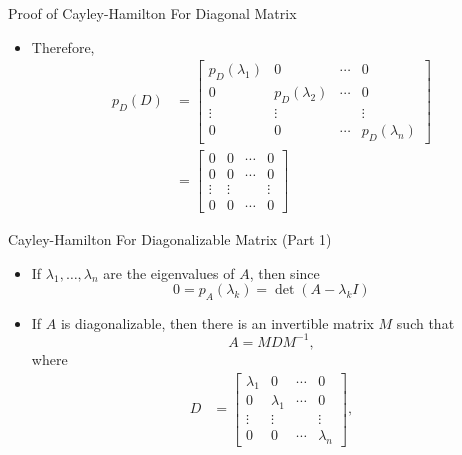 \documentclass[usenames,dvipsnames,10pt]{beamer}
\begin{document}
\begin{frame}
  {Proof of Cayley-Hamilton For Diagonal Matrix}

  \begin{itemize}
  \item Therefore,
    \begin{align*}
      p_D(D) &= 
               \begin{bmatrix}
                 p_D(\lambda_1) & 0 &\cdots & 0\\
                 0 &p_D(\lambda_2) & \cdots & 0\\
                 \vdots & \vdots & & \vdots\\
                 0 & 0 & \cdots & p_D(\lambda_n)
               \end{bmatrix}\\
             &= 
               \begin{bmatrix}
                 0 & 0 &\cdots & 0\\
                 0 & 0 & \cdots & 0\\
                 \vdots & \vdots & & \vdots\\
                 0 & 0 & \cdots & 0
               \end{bmatrix}
    \end{align*}
  \end{itemize}
\end{frame}

\begin{frame}
  {Cayley-Hamilton For Diagonalizable Matrix (Part 1)}

  \begin{itemize}
  \item If $\lambda_1, \dots, \lambda_n$ are the eigenvalues of $A$, then since
    \[ 0 = p_A(\lambda_k) = \det(A-\lambda_k I) \]
  \item If $A$ is diagonalizable, then there is an invertible matrix $M$ such that
    \[
      A = MDM^{-1},
    \]
    where
    \begin{align*}
      D &=
          \begin{bmatrix}
            \lambda_1 & 0 &\cdots & 0\\
            0 &\lambda_1 & \cdots & 0\\
            \vdots & \vdots & & \vdots\\
            0 & 0 & \cdots & \lambda_n
          \end{bmatrix},
    \end{align*}
  \end{itemize}
\end{frame}
\end{document}

